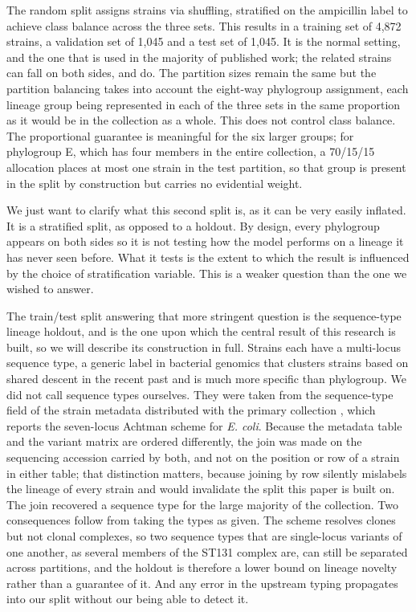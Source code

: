 \documentclass[journal]{IEEEtran}
\begin{document}
The random split assigns strains via shuffling, stratified on the ampicillin label
to achieve class balance across the three sets. This results in a training set of
4,872 strains, a validation set of 1,045 and a test set of 1,045. It is the normal
setting, and the one that is used in the majority of published work; the related
strains can fall on both sides, and do. The partition sizes remain the same but the
partition balancing takes into account the eight-way phylogroup assignment, each
lineage group being represented in each of the three sets in the same proportion as
it would be in the collection as a whole. This does not control class balance. The
proportional guarantee is meaningful for the six larger groups; for phylogroup E,
which has four members in the entire collection, a 70/15/15 allocation places at most
one strain in the test partition, so that group is present in the split by
construction but carries no evidential weight.

We just want to clarify what this second split is, as it can be very easily
inflated. It is a stratified split, as opposed to a holdout. By design, every
phylogroup appears on both sides so it is not testing how the model performs on a
lineage it has never seen before. What it tests is the extent to which the result is
influenced by the choice of stratification variable. This is a weaker question than
the one we wished to answer.

The train/test split answering that more stringent question is the sequence-type
lineage holdout, and is the one upon which the central result of this research is
built, so we will describe its construction in full. Strains each have a
multi-locus sequence type, a generic label in bacterial genomics that clusters
strains based on shared descent in the recent past and is much more specific than
phylogroup. We did not call sequence types ourselves. They were taken from the
sequence-type field of the strain metadata distributed with the primary collection
\cite{morin2024ecoli}, which reports the seven-locus Achtman scheme for
\textit{E. coli}. Because the metadata table and the variant matrix are ordered
differently, the join was made on the sequencing accession carried by both, and not
on the position or row of a strain in either table; that distinction matters, because
joining by row silently mislabels the lineage of every strain and would invalidate the
split this paper is built on. The join recovered a sequence type for the large
majority of the collection. Two consequences follow from taking the types as given.
The scheme resolves clones but not clonal complexes, so two sequence types that are
single-locus variants of one another, as several members of the ST131 complex are,
can still be separated across partitions, and the holdout is therefore a lower bound
on lineage novelty rather than a guarantee of it. And any error in the upstream typing
propagates into our split without our being able to detect it.
\end{document}
